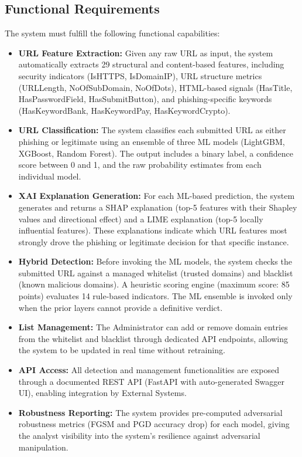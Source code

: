 \subsection{Functional Requirements}

The system must fulfill the following functional capabilities:

\begin{itemize}
    \item \textbf{URL Feature Extraction:} Given any raw URL as input, the system automatically extracts 29 structural and content-based features, including security indicators (IsHTTPS, IsDomainIP), URL structure metrics (URLLength, NoOfSubDomain, NoOfDots), HTML-based signals (HasTitle, HasPasswordField, HasSubmitButton), and phishing-specific keywords (HasKeywordBank, HasKeywordPay, HasKeywordCrypto).

    \item \textbf{URL Classification:} The system classifies each submitted URL as either phishing or legitimate using an ensemble of three ML models (LightGBM, XGBoost, Random Forest). The output includes a binary label, a confidence score between 0 and 1, and the raw probability estimates from each individual model.

    \item \textbf{XAI Explanation Generation:} For each ML-based prediction, the system generates and returns a SHAP explanation (top-5 features with their Shapley values and directional effect) and a LIME explanation (top-5 locally influential features). These explanations indicate which URL features most strongly drove the phishing or legitimate decision for that specific instance.

    \item \textbf{Hybrid Detection:} Before invoking the ML models, the system checks the submitted URL against a managed whitelist (trusted domains) and blacklist (known malicious domains). A heuristic scoring engine (maximum score: 85 points) evaluates 14 rule-based indicators. The ML ensemble is invoked only when the prior layers cannot provide a definitive verdict.

    \item \textbf{List Management:} The Administrator can add or remove domain entries from the whitelist and blacklist through dedicated API endpoints, allowing the system to be updated in real time without retraining.

    \item \textbf{API Access:} All detection and management functionalities are exposed through a documented REST API (FastAPI with auto-generated Swagger UI), enabling integration by External Systems.

    \item \textbf{Robustness Reporting:} The system provides pre-computed adversarial robustness metrics (FGSM and PGD accuracy drop) for each model, giving the analyst visibility into the system's resilience against adversarial manipulation.
\end{itemize}


